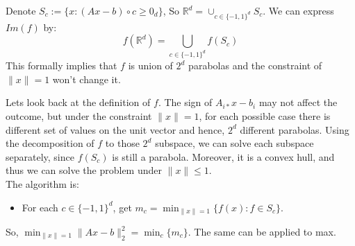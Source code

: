 \documentclass[12pt, a4paper]{article}
\newcommand{\norm}[1]{\lVert #1 \rVert}
\newcommand{\double}[1]{\mathbb{#1}}
\begin{document}
Denote $S_c:=\{x: (Ax-b)\circ c\geq 0_d\}$, So $\double{R}^d=\cup_{c\in\{-1,1\}^d} S_c$. We can express $Im(f)$ by:
\[f(\double{R}^d)=\bigcup_{c\in\{-1,1\}^d} f(S_c)\]
This formally implies that $f$ is union of $2^d$ parabolas and the constraint of $\norm{x}=1$ won't change it.

Lets look back at the definition of $f$. The sign of $A_{i*}x-b_i$ may not affect the outcome, but under the constraint $\norm{x}=1$, for each possible case there is different set of values on the unit vector and hence, $2^d$ different parabolas. Using the decomposition of $f$ to those $2^d$ subspace, we can solve each subspace separately, since $f(S_c)$ is still a parabola. Moreover, it is a convex hull, and thus we can solve the problem under $\norm{x}\leq 1$. \\

The algorithm is:
\begin{itemize}
    \item For each $c\in\{-1,1\}^d$, get $m_c=\min_{\norm{x}=1}\{f(x): f\in S_c\}$.
\end{itemize}
So, $\min_{\norm{x}=1} \norm{Ax-b}_2^2=\min_c \{m_c\}$. The same can be applied to max.

\newpage
\end{document}
